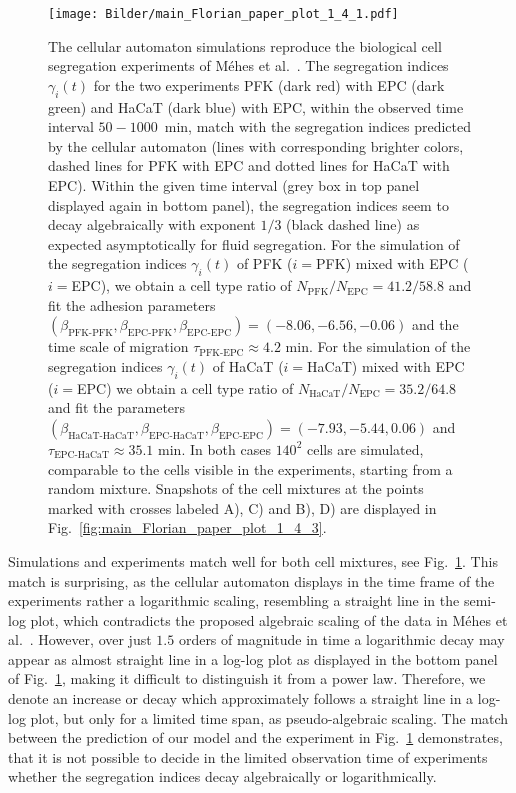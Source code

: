 \documentclass[10pt,letterpaper]{article}
\newcommand{\figref}[1]{Fig.~\ref{fig:#1}}
\begin{document}
\begin{figure}[ht!]
 \centering

 \texttt{[image: Bilder/main\_Florian\_paper\_plot\_1\_4\_1.pdf]}
 \caption{The cellular automaton simulations reproduce the biological
   cell segregation experiments of Méhes et
   al.~\cite{MehMonNemVic2012}. The segregation indices $\gamma_i(t)$
   for the two experiments PFK (dark red) with EPC (dark green) and
   HaCaT (dark blue) with EPC, within the observed time interval
   $50 - 1000$~min, match with the segregation indices predicted by
   the cellular automaton (lines with corresponding brighter colors,
   dashed lines for PFK with EPC and dotted lines for HaCaT with EPC).
   Within the given time interval (grey box in top panel displayed
   again in bottom panel), the segregation indices seem to decay
   algebraically with exponent $1/3$ (black dashed line) as expected
   asymptotically for fluid segregation. For the simulation of the
   segregation indices $\gamma_i(t)$ of PFK ($i=$PFK) mixed with EPC
   ($i=$EPC), we obtain a cell type ratio of
   $N_{\text{PFK}}/N_{\text{EPC}}=41.2/58.8$ and fit the adhesion
   parameters
   $(\beta_\text{PFK-PFK},\beta_\text{EPC-PFK},\beta_\text{EPC-EPC})=(-8.06,-6.56,-0.06)$
   and the time scale of migration
   $\tau_\text{PFK-EPC}\approx 4.2 \text{ min}$. For the simulation of
   the segregation indices $\gamma_i(t)$ of HaCaT ($i=$HaCaT) mixed
   with EPC ($i=$EPC) we obtain a cell type ratio of
   $N_{\text{HaCaT}}/N_{\text{EPC}}=35.2/64.8$ and fit the parameters
   $(\beta_\text{HaCaT-HaCaT},\beta_\text{EPC-HaCaT},\beta_\text{EPC-EPC})=(-7.93,-5.44,0.06)$
   and $\tau_\text{EPC-HaCaT} \approx 35.1 \text{ min}$. In both cases
   $140^2$ cells are simulated, comparable to the cells visible in the
   experiments, starting from a random mixture. Snapshots of the cell
   mixtures at the points marked with crosses labeled A), C) and B),
   D) are displayed in \figref{main_Florian_paper_plot_1_4_3}.}
 \label{fig:main_Florian_paper_plot_1_4_1}
\end{figure}
%
Simulations and experiments match well for both cell mixtures, see
\figref{main_Florian_paper_plot_1_4_1}. This match is surprising, as
the cellular automaton displays in the time frame of the experiments rather a logarithmic scaling,
resembling a straight line in the semi-log plot, which contradicts the
proposed algebraic scaling of the data in Méhes et
al.~\cite{MehMonNemVic2012}. However, over just $1.5$ orders of
magnitude in time a logarithmic decay may appear as almost straight
line in a log-log plot as displayed in the bottom panel of
\figref{main_Florian_paper_plot_1_4_1}, making it difficult to
distinguish it from a power law. Therefore, we denote an increase or
decay which approximately follows a straight line in a log-log plot,
but only for a limited time span, as pseudo-algebraic scaling. The
match between the prediction of our model and the experiment in
\figref{main_Florian_paper_plot_1_4_1} demonstrates, that it is not
possible to decide in the limited observation time of experiments
whether the segregation indices decay algebraically or
logarithmically.
\end{document}
